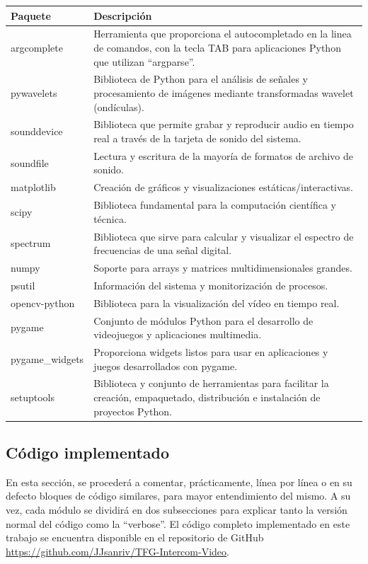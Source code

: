 \begin{center}
\label{tab:paquetes}
\begin{tabular}{|p{2.5cm}|p{12.6cm}|}
    \hline
    \textbf{Paquete} & \textbf{Descripción } \\
    \hline
    argcomplete & Herramienta que proporciona el autocompletado en la linea de comandos, con la tecla TAB para aplicaciones Python que utilizan ``argparse''. \\
    \hline
    pywavelets & Biblioteca de Python para el análisis de señales y procesamiento de imágenes mediante transformadas wavelet (ondículas). \\
    \hline
    sounddevice & Biblioteca que permite grabar y reproducir audio en tiempo real a través de la tarjeta de sonido del sistema. \\
    \hline
    soundfile & Lectura y escritura de la mayoría de formatos de archivo de sonido. \\
    \hline
    matplotlib & Creación de gráficos y visualizaciones estáticas/interactivas. \\
    \hline
    scipy & Biblioteca fundamental para la computación científica y técnica. \\
    \hline
    spectrum & Biblioteca que sirve para calcular y visualizar el espectro de frecuencias de una señal digital. \\
    \hline
    numpy & Soporte para arrays y matrices multidimensionales grandes. \\
    \hline
    psutil & Información del sistema y monitorización de procesos. \\
    \hline
    opencv-python & Biblioteca para la visualización del vídeo en tiempo real. \\
    \hline
    pygame & Conjunto de módulos Python para el desarrollo de videojuegos y aplicaciones multimedia. \\
    \hline
    pygame\_widgets & Proporciona widgets listos para usar en aplicaciones y juegos desarrollados con pygame. \\
    \hline
    setuptools & Biblioteca y conjunto de herramientas para facilitar la creación, empaquetado, distribución e instalación de proyectos Python. \\
    \hline
\end{tabular}
\end{center}

\subsection{Código implementado}
En esta sección, se procederá a comentar, prácticamente, línea por línea o en su defecto bloques de código similares, para mayor entendimiento del mismo. A su vez, cada módulo se dividirá en dos subsecciones para explicar tanto la versión normal del código como la ``verbose''. El código completo implementado en este trabajo se encuentra disponible en el repositorio de GitHub \url{https://github.com/JJsanriv/TFG-Intercom-Video}.

